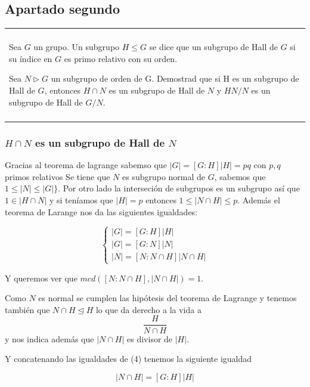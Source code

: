\documentclass[12pt]{article}
\newenvironment{micaja}
{
    \begin{center}
    \begin{tabular}{|p{0.9\textwidth}|}
    \hline\\
    }   
    {   
    \\\\\hline
    \end{tabular} 
    \end{center}
    }
\begin{document}
\subsection{Apartado segundo}

\begin{micaja}
    Sea $G$ un grupo. Un subgrupo $H \leq G$ se dice que un subgrupo de Hall de $G$ si su 
    índice  en $G$ es primo relativo con su orden.

    Sea $N \triangleright G$ un subgrupo de orden de G. Demostrad que si H es un subgrupo de Hall de 
    $G$, entonces $H \cap N$ es un subgrupo de Hall de $N$ y $HN/N$ es un subgrupo de Hall de $G/N.$
\end{micaja}


\subsubsection*{$H \cap N$ es un subgrupo de Hall de $N$ }

Gracias al teorema de lagrange sabemso que $|G| = [G:H] |H| = pq$ con $p,q$ primos relativos
Se tiene que $N$ es subgrupo normal de $G$, sabemos que $1 \leq |N| \leq |G|\}.$
Por otro lado la interseción de subgrupos es un subgrupo así que $1 \in |H \cap N|$ y si 
teníamos que $|H|=p$  entonces $1 \leq |N \cap H| \leq p.$
Además el teorema de Larange nos da las siguientes igualdades:


\begin{equation}
    \left\{
      \begin{array}{l}
        |G| = [G:H] |H|\\
        |G| = [G:N] |N| \\
        |N| = [N: N \cap H] |N\cap H|   
      \end{array}
      \right.
  \end{equation}



Y queremos ver que $mcd([N: N \cap H] ,|N\cap H|) = 1.$

Como $N$ es normal se cumplen las hipótesis del teorema de Lagrange
y tenemos también que $N \cap H \trianglelefteq H$
lo que da derecho a la vida a 
$$\frac{H}{N \cap H}$$ y nos indica además que $|N\cap H|$ es 
divisor de $|H|.$

Y concatenando las igualdades de (4) tenemos la siguiente igualdad

\begin{equation*}
    [G:N] [N: N \cap H] |N\cap H|  = [G:H] |H|
\end{equation*}
\end{document}
